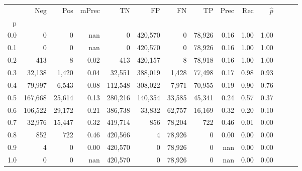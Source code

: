 \begin{tabular}{rrrrrrrrrrrrrr}
\toprule
{} &      Neg &     Pos & mPrec &       TN &       FP &      FN &      TP &  Prec &   Rec & $\hat{p}$ \\
p   &          &         &       &          &          &         &         &       &       &           \\
\midrule
0.0 &        0 &       0 &   nan &        0 &  420,570 &       0 &  78,926 &  0.16 &  1.00 &      1.00 \\
0.1 &        0 &       0 &   nan &        0 &  420,570 &       0 &  78,926 &  0.16 &  1.00 &      1.00 \\
0.2 &      413 &       8 &  0.02 &      413 &  420,157 &       8 &  78,918 &  0.16 &  1.00 &      1.00 \\
0.3 &   32,138 &   1,420 &  0.04 &   32,551 &  388,019 &   1,428 &  77,498 &  0.17 &  0.98 &      0.93 \\
0.4 &   79,997 &   6,543 &  0.08 &  112,548 &  308,022 &   7,971 &  70,955 &  0.19 &  0.90 &      0.76 \\
0.5 &  167,668 &  25,614 &  0.13 &  280,216 &  140,354 &  33,585 &  45,341 &  0.24 &  0.57 &      0.37 \\
0.6 &  106,522 &  29,172 &  0.21 &  386,738 &   33,832 &  62,757 &  16,169 &  0.32 &  0.20 &      0.10 \\
0.7 &   32,976 &  15,447 &  0.32 &  419,714 &      856 &  78,204 &     722 &  0.46 &  0.01 &      0.00 \\
0.8 &      852 &     722 &  0.46 &  420,566 &        4 &  78,926 &       0 &  0.00 &  0.00 &      0.00 \\
0.9 &        4 &       0 &  0.00 &  420,570 &        0 &  78,926 &       0 &   nan &  0.00 &      0.00 \\
1.0 &        0 &       0 &   nan &  420,570 &        0 &  78,926 &       0 &   nan &  0.00 &      0.00 \\
\bottomrule
\end{tabular}
